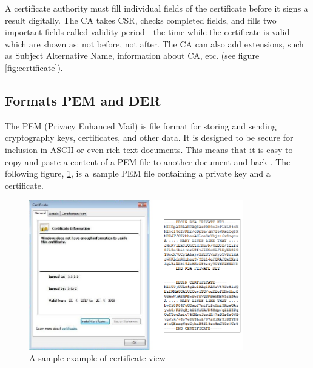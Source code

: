 \documentclass[
  oneside, 12pt, 
  printed, %
  notable,   %
  nolof,     %
  nolot,     %
]{fithesis3}
\begin{document}
A certificate authority must fill individual fields of the certificate before it signs a 
result digitally. The CA takes CSR, checks completed fields, and fills two important fields 
called validity period - the time while the certificate is valid - which are shown as: not 
before, not after. The CA can also add extensions, such as Subject Alternative Name, information 
about CA, etc. (see figure \ref{fig:certificate}).

\subsection{Formats PEM and DER}
The PEM (Privacy Enhanced Mail) is  file format for storing and sending cryptography keys, 
certificates, and other data. It is designed to be secure for inclusion in ASCII or even rich-text 
documents. This means that it is easy to copy and paste a content of a PEM file to another document 
and back \cite{howToSsl}. The following figure, \ref{fig:vzorPEM-DER}, is a~sample PEM file 
containing a private key and a certificate. 

\begin{figure}[th]
	\centering
	\includegraphics[width=0.83\textwidth]{pem-der-fig}
	\caption{A sample example of certificate view}
	\label{fig:vzorPEM-DER}
\end{figure}
\end{document}

